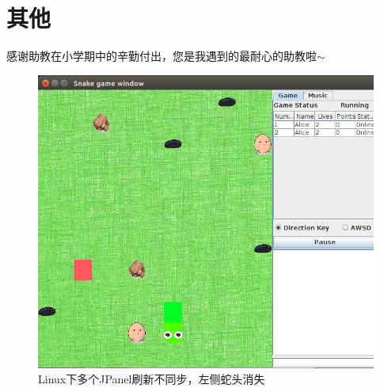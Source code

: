 \documentclass[12pt]{article}
\begin{document}
  \section{其他}
  感谢助教在小学期中的辛勤付出，您是我遇到的最耐心的助教啦$\sim$ 
\begin{figure}[h]
\centering
\includegraphics[width=0.7\linewidth]{linux}
\caption{Linux下多个JPanel刷新不同步，左侧蛇头消失}
\label{fig:linux}
\end{figure}
  
\end{document}
